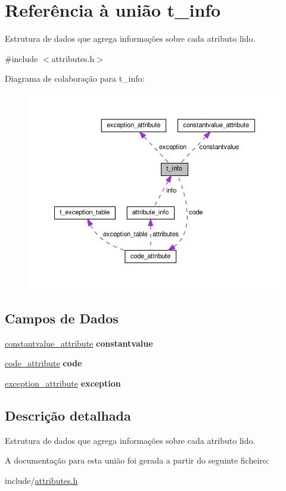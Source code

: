 \hypertarget{uniont__info}{}\section{Referência à união t\+\_\+info}
\label{uniont__info}


Estrutura de dados que agrega informações sobre cada atributo lido.  




{\ttfamily \#include $<$attributes.\+h$>$}



Diagrama de colaboração para t\+\_\+info\+:
\nopagebreak
\begin{figure}[H]
\begin{center}
\leavevmode
\includegraphics[width=350pt]{uniont__info__coll__graph}
\end{center}
\end{figure}
\subsection*{Campos de Dados}
\begin{DoxyCompactItemize}
\item 
\mbox{\label{uniont__info_ab4a27f0438794e6a65bbdd9776fe657a}} 
\hyperlink{structconstantvalue__attribute}{constantvalue\+\_\+attribute} {\bfseries constantvalue}
\item 
\mbox{\label{uniont__info_a71f98a8da1881861b03ab649c3c7a788}} 
\hyperlink{structcode__attribute}{code\+\_\+attribute} {\bfseries code}
\item 
\mbox{\label{uniont__info_ad8bba19df869f74ce8cb48ae37c3fff4}} 
\hyperlink{structexception__attribute}{exception\+\_\+attribute} {\bfseries exception}
\end{DoxyCompactItemize}


\subsection{Descrição detalhada}
Estrutura de dados que agrega informações sobre cada atributo lido. 

A documentação para esta união foi gerada a partir do seguinte ficheiro\+:\begin{DoxyCompactItemize}
\item 
include/\hyperlink{attributes_8h}{attributes.\+h}\end{DoxyCompactItemize}
